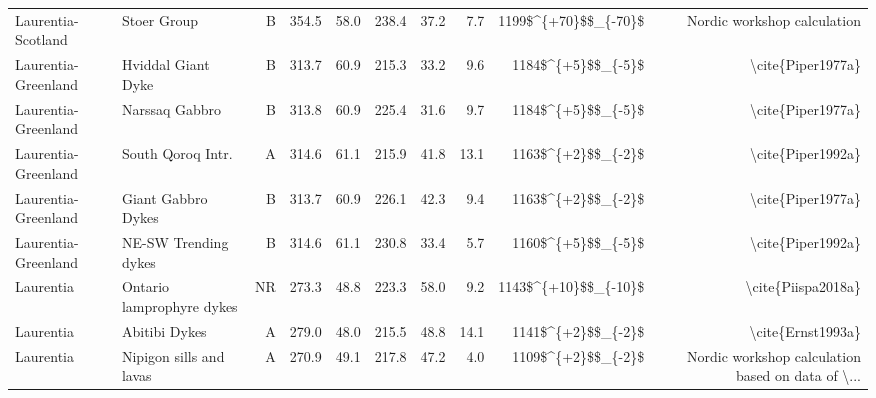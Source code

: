 \begin{longtable}{p{1 in}p{1 in}rrrrrrrr}
            Laurentia-Scotland &                                      Stoer Group &      B &     354.5 &      58.0 & 238.4 &  37.2 &       7.7 &   1199\$\textasciicircum \{+70\}\$\$\_\{-70\}\$ &                        Nordic workshop calculation \\
           Laurentia-Greenland &                               Hviddal Giant Dyke &      B &     313.7 &      60.9 & 215.3 &  33.2 &       9.6 &     1184\$\textasciicircum \{+5\}\$\$\_\{-5\}\$ &                                  \textbackslash cite\{Piper1977a\} \\
           Laurentia-Greenland &                                   Narssaq Gabbro &      B &     313.8 &      60.9 & 225.4 &  31.6 &       9.7 &     1184\$\textasciicircum \{+5\}\$\$\_\{-5\}\$ &                                  \textbackslash cite\{Piper1977a\} \\
           Laurentia-Greenland &                                South Qoroq Intr. &      A &     314.6 &      61.1 & 215.9 &  41.8 &      13.1 &     1163\$\textasciicircum \{+2\}\$\$\_\{-2\}\$ &                                  \textbackslash cite\{Piper1992a\} \\
           Laurentia-Greenland &                               Giant Gabbro Dykes &      B &     313.7 &      60.9 & 226.1 &  42.3 &       9.4 &     1163\$\textasciicircum \{+2\}\$\$\_\{-2\}\$ &                                  \textbackslash cite\{Piper1977a\} \\
           Laurentia-Greenland &                             NE-SW Trending dykes &      B &     314.6 &      61.1 & 230.8 &  33.4 &       5.7 &     1160\$\textasciicircum \{+5\}\$\$\_\{-5\}\$ &                                  \textbackslash cite\{Piper1992a\} \\
                     Laurentia &                        Ontario lamprophyre dykes &     NR &     273.3 &      48.8 & 223.3 &  58.0 &       9.2 &   1143\$\textasciicircum \{+10\}\$\$\_\{-10\}\$ &                                 \textbackslash cite\{Piispa2018a\} \\
                     Laurentia &                                    Abitibi Dykes &      A &     279.0 &      48.0 & 215.5 &  48.8 &      14.1 &     1141\$\textasciicircum \{+2\}\$\$\_\{-2\}\$ &                                  \textbackslash cite\{Ernst1993a\} \\
                     Laurentia &                          Nipigon sills and lavas &      A &     270.9 &      49.1 & 217.8 &  47.2 &       4.0 &     1109\$\textasciicircum \{+2\}\$\$\_\{-2\}\$ &  Nordic workshop calculation based on data of \textbackslash ... \\

\end{longtable}
